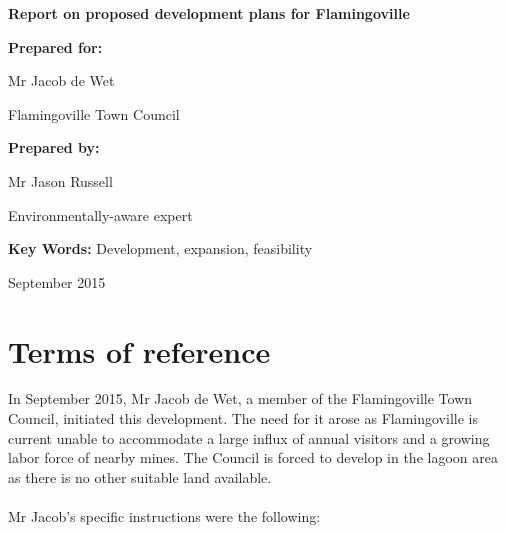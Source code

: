 \documentclass{article}
\begin{document}
\begin{titlepage}
	\begin{center}
		\vspace*{1cm}
		
		\textbf{Report on proposed development plans for Flamingoville}
		
		\vspace{1.5cm}
		
		\textbf{Prepared for:}
		
		Mr Jacob de Wet
		
		Flamingoville Town Council
		
		\vspace{1.5cm}
		
		\textbf{Prepared by:}
		
		Mr Jason Russell
		
		Environmentally-aware expert
		
		\vspace{1.5cm}

		\textbf{Key Words:}
		Development, expansion, feasibility
		
		\vspace{1.5cm}
		September 2015
		
	\end{center}
\end{titlepage}
\thispagestyle{empty}

\setcounter{page}{0}

\newpage
\section*{Terms of reference}
In September 2015, Mr Jacob de Wet, a member of the Flamingoville Town Council, initiated this development. The need for it arose as Flamingoville is current unable to accommodate a large influx of annual visitors and a growing labor force of nearby mines. The Council is forced to develop in the lagoon area as there is no other suitable land available.

\paragraph{}

Mr Jacob's specific instructions were the following:
\end{document}
